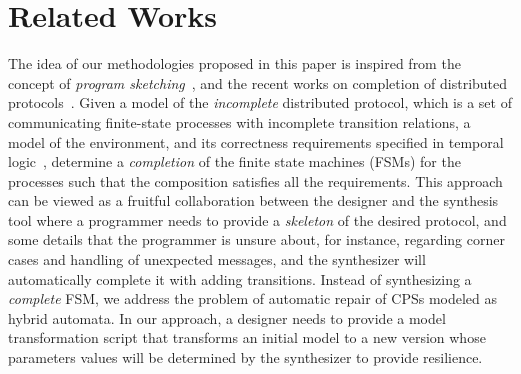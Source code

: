 \section{Related Works}
%
The idea of our methodologies proposed in this paper is inspired from the concept of \emph{program sketching}~\cite{solar2013program,solar2005programming}, and the recent works on completion of distributed protocols~\cite{alur2017automatic, alur2015automatic, alur2014synthesizing}. Given a model of the \emph{incomplete} distributed protocol, which is a set of communicating finite-state processes with incomplete transition relations, a model of the environment, and its correctness requirements specified in temporal logic~\cite{clarke2000model}, determine a \emph{completion} of the finite state machines (FSMs) for the processes such that the composition satisfies all the requirements. This approach can be viewed as a fruitful collaboration between the designer and the synthesis tool where a programmer needs to provide a \emph{skeleton} of the desired protocol, and some details that the programmer is unsure about, for instance, regarding corner cases and handling of unexpected messages, and the synthesizer will automatically complete it with adding transitions.
%
%
Instead of synthesizing a \emph{complete} FSM, we address the problem of automatic repair of CPSs modeled as hybrid automata.%
%
%
%
 In our approach, a designer needs to provide a model transformation script that transforms an initial model to a new version whose parameters values will be determined by the synthesizer to provide resilience. 
%

